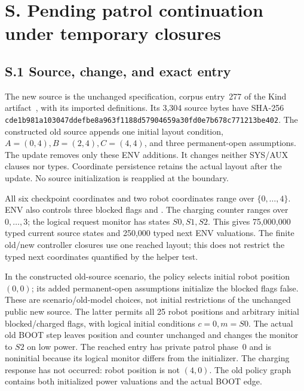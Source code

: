 \section*{S. Pending patrol continuation under temporary closures}
\subsection*{S.1 Source, change, and exact entry}
The new source is the unchanged  specification, corpus
entry~277 of the Kind artifact~\cite{kindartifact}, with its imported
 definitions. Its 3,304 source bytes have SHA-256
\nolinkurl{cde1b981a103047ddefbe8a963f1188d57904659a30fd0e7b678c771213be402}.
The constructed old source appends one initial layout condition,
$A=(0,4),B=(2,4),C=(4,4)$, and three permanent-open assumptions.
The update removes only these ENV additions. It changes neither SYS/AUX
clauses nor types. Coordinate persistence retains the actual layout
after the update. No source initialization is reapplied at the boundary.

All six checkpoint coordinates and two robot coordinates range over
$\{0,\ldots,4\}$. ENV also controls three blocked flags and
. The charging counter ranges over $0,\ldots,3$;
the logical request monitor has states $S0,S1,S2$. This gives 75,000,000
typed current source states and 250,000 typed next ENV valuations.
The finite old/new controller closures use one reached layout; this does
not restrict the typed next coordinates quantified by the helper test.

In the constructed old-source scenario, the policy selects initial
robot position $(0,0)$; its added permanent-open assumptions initialize
the blocked flags false. These are scenario/old-model choices, not
initial restrictions of the unchanged public new source. The latter
permits all 25 robot positions and arbitrary initial blocked/charged
flags, with logical initial conditions $c=0,m=S0$.
The actual old BOOT step leaves position and counter unchanged and
changes the monitor to $S2$ on low power. The reached entry has private
patrol phase~0 and is noninitial because
its logical monitor differs from the initializer. The charging response
has not occurred: robot position is not $(4,0)$. The old policy graph
contains both initialized power valuations and the actual BOOT edge.

